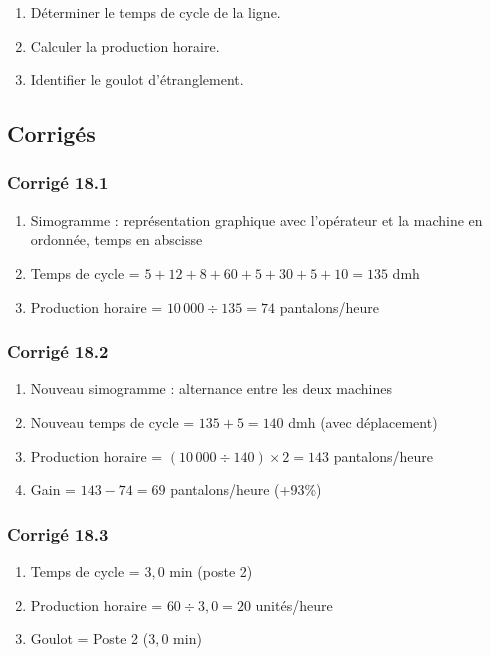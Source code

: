 \documentclass[a4paper,12pt]{article}
\begin{document}
\begin{enumerate}
    \item Déterminer le temps de cycle de la ligne.
    \item Calculer la production horaire.
    \item Identifier le goulot d'étranglement.
\end{enumerate}

\subsection{Corrigés}

\subsubsection*{Corrigé 18.1}

\begin{enumerate}
    \item Simogramme : représentation graphique avec l'opérateur et la machine en ordonnée, temps en abscisse
    \item Temps de cycle = $5+12+8+60+5+30+5+10 = 135$ dmh
    \item Production horaire = $10\,000 \div 135 = 74$ pantalons/heure
\end{enumerate}

\subsubsection*{Corrigé 18.2}

\begin{enumerate}
    \item Nouveau simogramme : alternance entre les deux machines
    \item Nouveau temps de cycle = $135 + 5 = 140$ dmh (avec déplacement)
    \item Production horaire = $(10\,000 \div 140) \times 2 = 143$ pantalons/heure
    \item Gain = $143 - 74 = 69$ pantalons/heure (+93\%)
\end{enumerate}

\subsubsection*{Corrigé 18.3}

\begin{enumerate}
    \item Temps de cycle = $3,0$ min (poste 2)
    \item Production horaire = $60 \div 3,0 = 20$ unités/heure
    \item Goulot = Poste 2 ($3,0$ min)
\end{enumerate}
\end{document}
